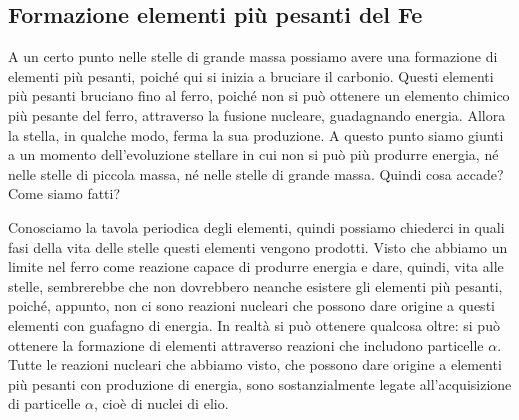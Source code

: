 \subsection{Formazione elementi più pesanti del Fe}
A un certo punto nelle stelle di grande massa possiamo avere una formazione di elementi più pesanti, poiché qui si inizia a bruciare il carbonio. Questi elementi più pesanti bruciano fino al ferro, poiché non si può ottenere un elemento chimico più pesante del ferro, attraverso la fusione nucleare, guadagnando energia. Allora la stella, in qualche modo, ferma la sua produzione. A questo punto siamo giunti a un momento dell'evoluzione stellare in cui non si può più produrre energia, né nelle stelle di piccola massa, né nelle stelle di grande massa. Quindi cosa accade? Come siamo fatti?


Conosciamo la tavola periodica degli elementi, quindi possiamo chiederci in quali fasi della vita delle stelle questi elementi vengono prodotti. Visto che abbiamo un limite nel ferro come reazione capace di produrre energia e dare, quindi, vita alle stelle, sembrerebbe che non dovrebbero neanche esistere gli elementi più pesanti, poiché, appunto, non ci sono reazioni nucleari che possono dare origine a questi elementi con guafagno di energia. In realtà si può ottenere qualcosa oltre: si può ottenere la formazione di elementi attraverso reazioni che includono particelle $\alpha$. Tutte le reazioni nucleari che abbiamo visto, che possono dare origine a elementi più pesanti con produzione di energia, sono sostanzialmente legate all'acquisizione di particelle $\alpha$, cioè di nuclei di elio.

